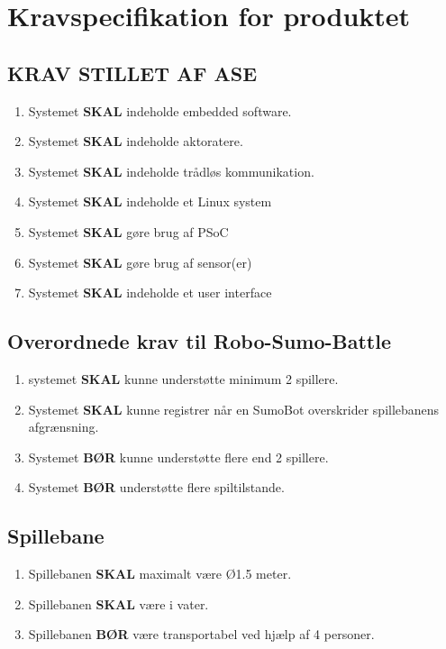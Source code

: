 



\section{Kravspecifikation for produktet}

\subsection{KRAV STILLET AF ASE}
\begin{enumerate}
    \item Systemet \textbf{SKAL} indeholde embedded software.
    \item Systemet \textbf{SKAL} indeholde aktoratere.
    \item Systemet \textbf{SKAL} indeholde trådløs kommunikation.
    \item Systemet \textbf{SKAL} indeholde et Linux system
    \item Systemet \textbf{SKAL} gøre brug af PSoC
    \item Systemet \textbf{SKAL} gøre brug af sensor(er)
    \item Systemet \textbf{SKAL} indeholde et user interface
    
\end{enumerate}

\subsection{Overordnede krav til Robo-Sumo-Battle}
\begin{enumerate}
    \item systemet \textbf{SKAL} kunne understøtte minimum 2 spillere.
    \item Systemet \textbf{SKAL} kunne registrer når en SumoBot overskrider spillebanens afgrænsning.
    \item Systemet \textbf{BØR} kunne understøtte flere end 2 spillere.  
    \item Systemet \textbf{BØR} understøtte flere spiltilstande.
\end{enumerate}

\subsection{Spillebane}
\begin{enumerate}
    \item Spillebanen \textbf{SKAL} maximalt være Ø1.5 meter.
    \item Spillebanen \textbf{SKAL} være i vater.
    \item  \color{red} Spillebanen \textbf{BØR} være transportabel ved hjælp af 4 personer.
\end{enumerate}

